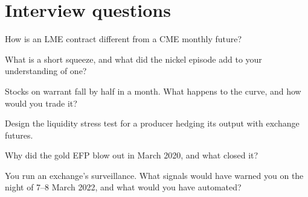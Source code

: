 \section{Interview questions}

\begin{interviewq}\label{iq:m3:metals:1}
How is an LME contract different from a CME monthly future?
\end{interviewq}

\begin{interviewq}\label{iq:m3:metals:2}
What is a short squeeze, and what did the nickel episode add to your understanding of one?
\end{interviewq}

\begin{interviewq}\label{iq:m3:metals:3}
Stocks on warrant fall by half in a month. What happens to the curve, and how would you trade it?
\end{interviewq}

\begin{interviewq}\label{iq:m3:metals:4}
Design the liquidity stress test for a producer hedging its output with exchange futures.
\end{interviewq}

\begin{interviewq}\label{iq:m3:metals:5}
Why did the gold EFP blow out in March 2020, and what closed it?
\end{interviewq}

\begin{interviewq}\label{iq:m3:metals:6}
You run an exchange's surveillance. What signals would have warned you on the night of 7--8 March
2022, and what would you have automated?
\end{interviewq}
